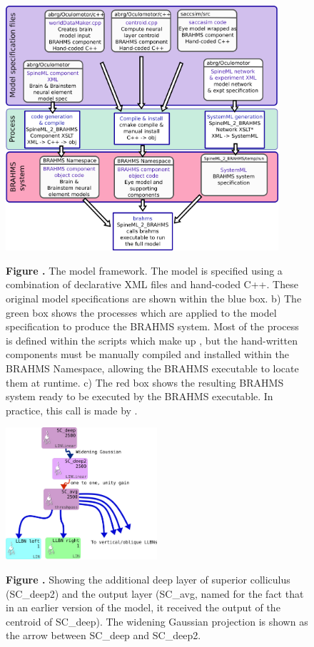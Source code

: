 \documentclass{frontiersSCNS}
\begin{document}
\begin{figure}[htb!]
\begin{center}
\includegraphics[width=0.9\textwidth]{./figures/model_framework.png}
\end{center}
\textbf{\label{model_framework} Figure .}
{ The model framework. The model is specified using a combination of
declarative XML files and hand-coded C++. These original model
specifications are shown within the blue box. b) The green box shows
the processes which are applied to the model specification to produce
the BRAHMS system. Most of the process is defined within the scripts
which make up \stob, but the hand-written components must be manually
compiled and installed within the BRAHMS Namespace, allowing the
BRAHMS executable to locate them at runtime. c) The red box shows the
resulting BRAHMS system ready to be executed by the BRAHMS
executable. In practice, this call is made by \stob.}
\end{figure}

\begin{figure}[htb!]
\begin{center}
\includegraphics[width=0.5\textwidth]{./figures/SC_to_brainstem.png}
\end{center}
\textbf{\label{scdeep} Figure .}
{ Showing the additional deep layer of superior colliculus (SC\_deep2)
and the output layer (SC\_avg, named for the fact that in an earlier
version of the model, it received the output of the centroid of
SC\_deep).  The widening Gaussian projection is shown as the arrow
between SC\_deep and SC\_deep2.}
\end{figure}
\end{document}
